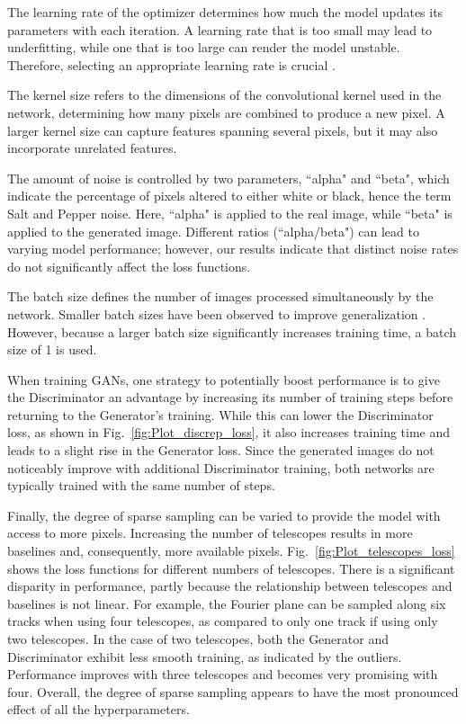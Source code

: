 The learning rate of the optimizer determines how much the model updates its parameters with each iteration. A learning rate that is too small may lead to underfitting, while one that is too large can render the model unstable. Therefore, selecting an appropriate learning rate is crucial \citep{murphy2022probabilistic}. 

The kernel size refers to the dimensions of the convolutional kernel used in the network, determining how many pixels are combined to produce a new pixel. A larger kernel size can capture features spanning several pixels, but it may also incorporate unrelated features. 

The amount of noise is controlled by two parameters, ``alpha" and ``beta", which indicate the percentage of pixels altered to either white or black, hence the term Salt and Pepper noise. Here, ``alpha" is applied to the real image, while ``beta" is applied to the generated image. Different ratios (``alpha/beta") can lead to varying model performance; however, our results indicate that distinct noise rates do not significantly affect the loss functions. 

The batch size defines the number of images processed simultaneously by the network. Smaller batch sizes have been observed to improve generalization \citep{prince2023understanding}. However, because a larger batch size significantly increases training time, a batch size of 1 is used.

When training GANs, one strategy to potentially boost performance is to give the Discriminator an advantage by increasing its number of training steps before returning to the Generator's training. While this can lower the Discriminator loss, as shown in Fig.~\ref{fig:Plot_discrep_loss}, it also increases training time and leads to a slight rise in the Generator loss. Since the generated images do not noticeably improve with additional Discriminator training, both networks are typically trained with the same number of steps.

Finally, the degree of sparse sampling can be varied to provide the model with access to more pixels. Increasing the number of telescopes results in more baselines and, consequently, more available pixels. Fig.~\ref{fig:Plot_telescopes_loss} shows the loss functions for different numbers of telescopes. There is a significant disparity in performance, partly because the relationship between telescopes and baselines is not linear. For example, the Fourier plane can be sampled along six tracks when using four telescopes, as compared to only one track if using only two telescopes. In the case of two telescopes, both the Generator and Discriminator exhibit less smooth training, as indicated by the outliers. Performance improves with three telescopes and becomes very promising with four. Overall, the degree of sparse sampling appears to have the most pronounced effect of all the hyperparameters.

